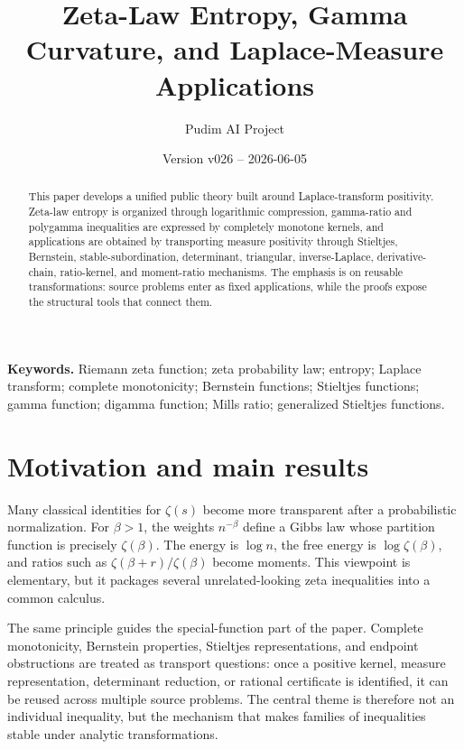\documentclass[11pt]{article}
\title{Zeta-Law Entropy, Gamma Curvature, and Laplace-Measure Applications}
\author{Pudim AI Project}
\date{Version v026 -- 2026-06-05}
\numberwithin{equation}{section}
\theoremstyle{definition}
\theoremstyle{remark}
\newcommand{\1}{\mathbf 1}
\begin{document}
\maketitle

\begin{abstract}
This paper develops a unified public theory built around Laplace-transform
positivity.  Zeta-law entropy is organized through logarithmic compression,
gamma-ratio and polygamma inequalities are expressed by completely monotone
kernels, and applications are obtained by transporting measure positivity
through Stieltjes, Bernstein, stable-subordination, determinant, triangular,
inverse-Laplace, derivative-chain, ratio-kernel, and moment-ratio mechanisms.
The emphasis is on reusable transformations: source problems enter as fixed
applications, while the proofs expose the structural tools that connect them.
\end{abstract}

\tableofcontents

\medskip



\noindent\textbf{Keywords.} Riemann zeta function; zeta probability law; entropy; Laplace transform; complete monotonicity; Bernstein functions; Stieltjes functions; gamma function; digamma function; Mills ratio; generalized Stieltjes functions.

\section{Motivation and main results}

Many classical identities for \(\zeta(s)\) become more transparent after a
probabilistic normalization.  For \(\beta>1\), the weights \(n^{-\beta}\)
define a Gibbs law whose partition function is precisely \(\zeta(\beta)\).
The energy is \(\log n\), the free energy is \(\log\zeta(\beta)\), and ratios
such as \(\zeta(\beta+r)/\zeta(\beta)\) become moments.  This viewpoint is
elementary, but it packages several unrelated-looking zeta inequalities into a
common calculus.

The same principle guides the special-function part of the paper.  Complete
monotonicity, Bernstein properties, Stieltjes representations, and endpoint
obstructions are treated as transport questions: once a positive kernel,
measure representation, determinant reduction, or rational certificate is
identified, it can be reused across multiple source problems.  The central
theme is therefore not an individual inequality, but the mechanism that makes
families of inequalities stable under analytic transformations.
\end{document}
